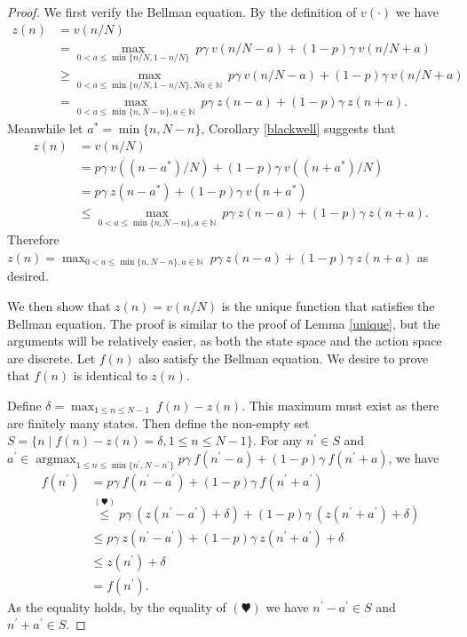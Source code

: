 \documentclass{article}
\theoremstyle{named}
\DeclareMathOperator*{\argmax}{arg max}
\begin{document}
\begin{proof}
We first verify the Bellman equation. 
By the definition of $v(\cdot)$ we have
\begin{align*}
z(n) & = v(n/N)\\
& = \max_{0<a\leq \min\{n/N, 1-n/N\}}\ p\gamma\ v(n/N-a)+(1-p)\gamma\ v(n/N+a)\\
& \geq \max_{0<a\leq \min\{n/N, 1-n/N\}, Na\in \mathbb{N}}\ p\gamma\ v(n/N-a)+(1-p)\gamma\ v(n/N+a)\\
& = \max_{0<a\leq \min\{n, N-n\}, a\in \mathbb{N}}\ p\gamma\ z({n-a})+(1-p)\gamma\ z({n+a}).
\end{align*}
Meanwhile let $a^\ast=\min\{n, N-n\}$, Corollary \ref{blackwell} suggests that
\begin{align*}
z(n) & = v(n/N)\\
& = p\gamma\ v((n-a^\ast)/N)+(1-p)\gamma\ v((n+a^\ast)/N)\\
& = p\gamma\ z({n-a^\ast})+(1-p)\gamma\ v({n+a^\ast})\\
& \leq \max_{0<a\leq \min\{n, N-n\}, a\in \mathbb{N}}\ p\gamma\ z({n-a})+(1-p)\gamma\ z({n+a}).
\end{align*}
Therefore $z(n)=\max_{0<a\leq \min\{n, N-n\}, a\in \mathbb{N}}\ p\gamma\ z({n-a})+(1-p)\gamma\ z({n+a})$ as desired.

We then show that $z(n)=v(n/N)$ is the unique function that satisfies the Bellman equation. The proof is similar to the proof of Lemma \ref{unique}, but the arguments will be relatively easier, as both the state space and the action space are discrete. Let $f(n)$ also satisfy the Bellman equation. We desire to prove that $f(n)$ is identical to $z(n)$.

Define $\delta=\max_{1\leq n\leq N-1}\ f(n)-z(n)$. This maximum must exist as there are finitely many states. Then define the non-empty set $S=\{n\mid f(n)-z(n)=\delta, 1\leq n \leq N-1\}$. 
For any ${n^\prime}\in S$ and $a^\prime\in\argmax_{1\leq n \leq \min\{n^\prime, N-n^\prime\}}p\gamma\ f(n^\prime-a)+(1-p)\gamma\ f(n^\prime+a)$, we have
\begin{align*}
f(n^\prime) &= p\gamma\ f(n^\prime-a^\prime)+(1-p)\gamma\ f(n^\prime+a^\prime) \\
&\stackrel{(\varheart)}{\leq} p\gamma\ (z(n^\prime-a^\prime)+\delta)+(1-p)\gamma\ (z(n^\prime+a^\prime)+\delta) \\
&\leq p\gamma\ z(n^\prime-a^\prime)+(1-p)\gamma\ z(n^\prime+a^\prime)+\delta \\
&\leq z(n^\prime) + \delta \\
&= f(n^\prime).
\end{align*}
As the equality holds, by the equality of $(\varheart)$ we have $n^\prime-a^\prime\in S$ and $n^\prime+a^\prime\in S$.


\end{proof}
\end{document}
